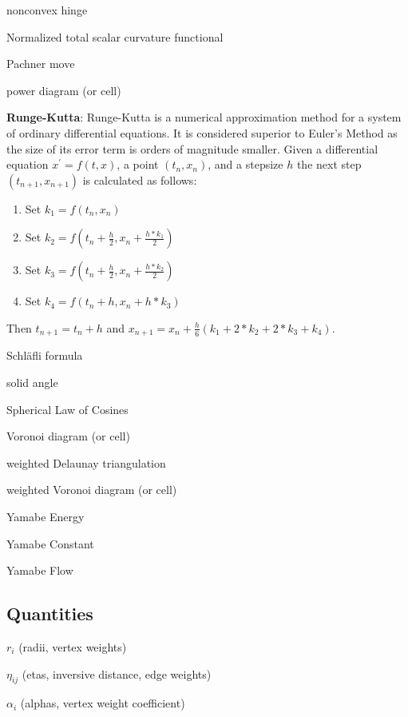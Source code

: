 \documentclass{article}
\begin{document}
nonconvex hinge

Normalized total scalar curvature functional

Pachner move

power diagram (or cell)

\hangindent=1.0cm \textbf{Runge-Kutta}: Runge-Kutta is a numerical
approximation method for a system of ordinary differential equations. It is
considered superior to Euler's Method as the size of its error term is
orders of magnitude smaller. Given a differential equation $x^{\prime
}=f(t,x)$, a point $(t_{n},x_{n})$, and a stepsize $h$ the next step $%
(t_{n+1},x_{n+1})$ is calculated as follows:

\begin{enumerate}
\item Set $k_1 = f(t_n, x_n)$ 

\item Set $k_2 = f(t_n + \frac{h}{2}, x_n + \frac{h*k_1}{2})$ 

\item Set $k_3 = f(t_n + \frac{h}{2}, x_n + \frac{h*k_2}{2})$ 

\item Set $k_4 = f(t_n + h, x_n + h*k_3)$ 
\end{enumerate}

 \hangindent=1.0cm \noindent Then $t_{n+1}=t_{n}+h$ and $%
x_{n+1}=x_{n}+\frac{h}{6}(k_{1}+2\ast k_{2}+2\ast k_{3}+k_{4}).$ \newline

Schl\"{a}fli formula

solid angle

Spherical Law of Cosines

Voronoi diagram (or cell)

weighted Delaunay triangulation

weighted Voronoi diagram (or cell)

Yamabe Energy

Yamabe Constant

Yamabe Flow

\bigskip

\subsection{Quantities}

$r_{i}$ (radii, vertex weights)

$\eta _{ij}$ (etas, inversive distance, edge weights)

$\alpha _{i}$ (alphas, vertex weight coefficient)
\end{document}
